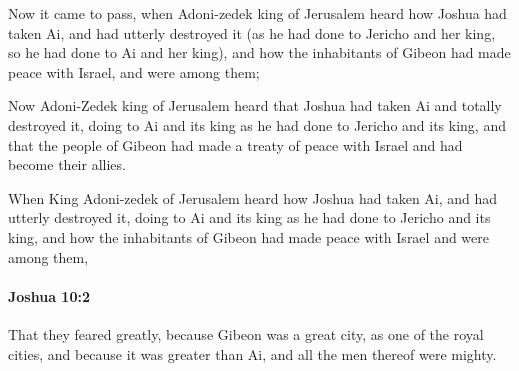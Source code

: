 			\begin{versebox}
					\item[BHS] 
					\item[ASV] Now it came to pass, when Adoni-zedek king of Jerusalem heard how Joshua had taken Ai, and had utterly destroyed it (as he had done to Jericho and her king, so he had done to Ai and her king), and how the inhabitants of Gibeon had made peace with Israel, and were among them;
					\item[NIV] Now Adoni-Zedek king of Jerusalem heard that Joshua had taken Ai and totally destroyed it, doing to Ai and its king as he had done to Jericho and its king, and that the people of Gibeon had made a treaty of peace with Israel and had become their allies.
					\item[NRSV] When King Adoni-zedek of Jerusalem heard how Joshua had taken Ai, and had utterly destroyed it, doing to Ai and its king as he had done to Jericho and its king, and how the inhabitants of Gibeon had made peace with Israel and were among them,
			\end{versebox}

		\paragraph{Joshua 10:2} %
			\label{JOSHUA-10-2}

			That they feared greatly, because Gibeon was a great city, as one of the royal cities, and because it was greater than Ai, and all the men thereof were mighty.


